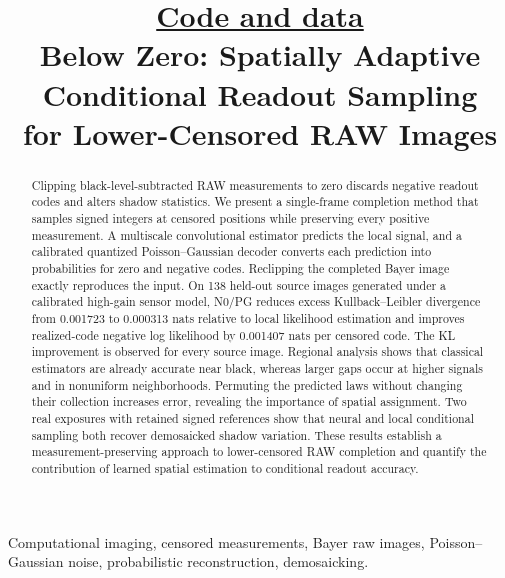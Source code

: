 \documentclass[10pt,twocolumn,journal]{IEEEtran}
\begin{document}
\title{{\normalsize \href{https://github.com/y-g-jiang/Video-RAW-Black-Level-Correction-Net/tree/main/below_zero}{Code and data}}\\[6pt]Below Zero: Spatially Adaptive\\Conditional Readout Sampling\\for Lower-Censored RAW Images}
\author{\BZAuthorBlockEN}
\maketitle
\thispagestyle{fancy}

\begin{abstract}
Clipping black-level-subtracted RAW measurements to zero discards negative readout codes and alters shadow statistics. We present a single-frame completion method that samples signed integers at censored positions while preserving every positive measurement. A multiscale convolutional estimator predicts the local signal, and a calibrated quantized Poisson--Gaussian decoder converts each prediction into probabilities for zero and negative codes. Reclipping the completed Bayer image exactly reproduces the input. On 138 held-out source images generated under a calibrated high-gain sensor model, N0/PG reduces excess Kullback--Leibler divergence from 0.001723 to 0.000313 nats relative to local likelihood estimation and improves realized-code negative log likelihood by 0.001407 nats per censored code. The KL improvement is observed for every source image. Regional analysis shows that classical estimators are already accurate near black, whereas larger gaps occur at higher signals and in nonuniform neighborhoods. Permuting the predicted laws without changing their collection increases error, revealing the importance of spatial assignment. Two real exposures with retained signed references show that neural and local conditional sampling both recover demosaicked shadow variation. These results establish a measurement-preserving approach to lower-censored RAW completion and quantify the contribution of learned spatial estimation to conditional readout accuracy.
\end{abstract}

\begin{IEEEkeywords}
Computational imaging, censored measurements, Bayer raw images, Poisson--Gaussian noise, probabilistic reconstruction, demosaicking.
\end{IEEEkeywords}
\end{document}
